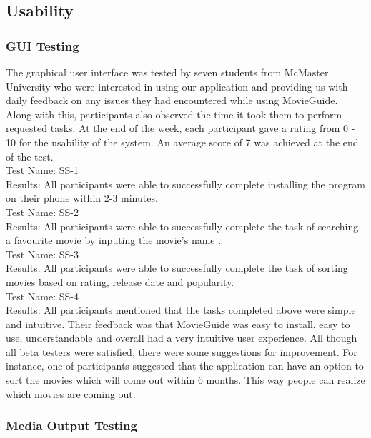 \documentclass[12pt, titlepage]{article}
\begin{document}
\subsection{Usability}
\subsubsection{GUI Testing}
The graphical user interface was tested by seven students from McMaster University who were interested in using our application and providing us with daily feedback on any issues they had encountered while using MovieGuide. Along with this, participants also observed the time it took them to perform requested tasks. At the end of the week, each participant gave a rating from 0 - 10 for the usability of the system. An average score of 7 was achieved at the end of the test.\\

	
Test Name: SS-1 \\
Results: All participants were able to successfully complete installing the program on their phone within 2-3 minutes.\\

Test Name: SS-2 \\
Results: All participants were able to successfully complete the task of searching a favourite movie by inputing the movie's name .\\

Test Name: SS-3 \\
Results: All participants were able to successfully complete the task of sorting movies based on rating, release date and popularity.\\


Test Name: SS-4 \\
Results: All participants mentioned that the tasks completed above were simple and  intuitive. Their feedback was that MovieGuide was easy to install, easy to use, understandable and overall had a very intuitive user experience. All though all beta testers were satisfied, there were some suggestions for improvement. For instance, one of participants suggested that the application can have an option to sort the movies which will come out within 6 months. This way people can realize which movies are coming out.\\


\subsubsection{Media Output Testing}
\end{document}
